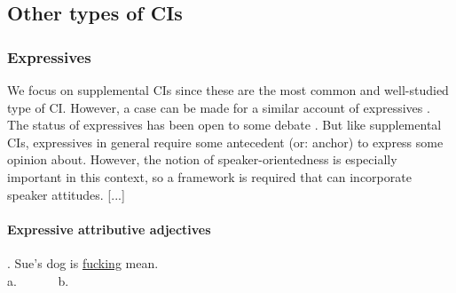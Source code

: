 \subsection{Other types of CIs}
\subsubsection{Expressives}

We focus on supplemental CIs since these are the most common and
well-studied type of CI.  However, a case can be made for a similar account
of expressives \citep[including expressive attributive adjectives, epithets,
honorifics, and tense-variations such as the German `Konjunktiv I';
cf.][]{potts2005logic}. The status of expressives has been open to some
debate \citep[...]{potts2004japanese,geurts2007fucking}.  But like
supplemental CIs, expressives in general require some antecedent (or:
anchor) to express some opinion about.
However,
the notion of speaker-orientedness is especially important in this context,
so a framework is required that can incorporate speaker attitudes.
[...]

\noindent\parbox[b]{\textwidth}{\paragraph{Expressive attributive adjectives}
\ex. Sue's dog is \underline{fucking} mean.\\
a.~~~
~~~b.~~~

}

